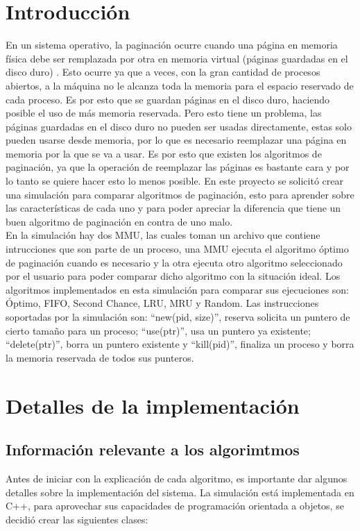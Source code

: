 \documentclass{report}
\begin{document}


\tableofcontents

\chapter{Introducción}\label{intro}
En un sistema operativo, la paginación ocurre cuando una página en memoria física debe ser remplazada por otra en memoria virtual (páginas guardadas en el disco duro) \cite{ref2}. 
Esto ocurre ya que a veces, con la gran cantidad de procesos abiertos, a la máquina no le alcanza toda la memoria para el espacio reservado de cada proceso. 
Es por esto que se guardan páginas en el disco duro, haciendo posible el uso de más memoria reservada.
Pero esto tiene un problema, las páginas guardadas en el disco duro no pueden ser usadas directamente, estas solo pueden usarse desde memoria, por lo que es necesario reemplazar una página en memoria por la que se va a usar.
Es por esto que existen los algoritmos de paginación, ya que la operación de reemplazar las páginas es bastante cara y por lo tanto se quiere hacer esto lo menos posible.
En este proyecto se solicitó crear una simulación para comparar algoritmos de paginación, esto para aprender sobre las características de cada uno y para poder apreciar la diferencia que tiene un buen algoritmo de paginación en contra de uno malo. \\

En la  simulación hay dos MMU, las cuales toman un archivo que contiene intrucciones que son parte de un proceso, una MMU ejecuta el algoritmo óptimo de paginación cuando es necesario y la otra ejecuta otro algoritmo seleccionado por el usuario para poder comparar dicho algoritmo con la situación ideal.
Los algoritmos implementados en esta simulación para comparar sus ejecuciones son: Óptimo, FIFO, Second Chance, LRU, MRU y Random.
Las instrucciones soportadas por la simulación son: ``new(pid, size)'', reserva solicita un puntero de cierto tamaño para un proceso; ``use(ptr)'', usa un puntero ya existente; ``delete(ptr)'', borra un puntero existente y ``kill(pid)'', finaliza un proceso y borra la memoria reservada de todos sus punteros. \\ 

\chapter{Detalles de la implementación}
\section {Información relevante a los algorimtmos}
Antes de iniciar con la explicación de cada algoritmo, es importante dar algunos detalles sobre la implementación del sistema. 
La simulación está implementada en C++, para aprovechar sus capacidades de programación orientada a objetos, se decidió crear las siguientes clases:
\end{document}
